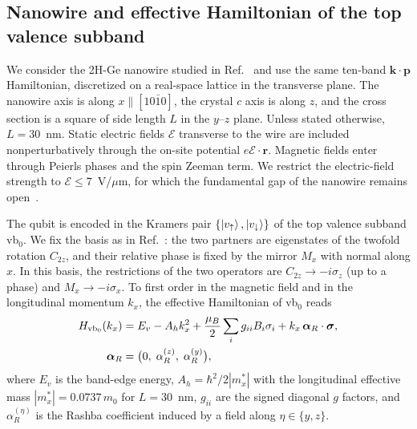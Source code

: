 \documentclass[
  aps,
  reprint,
  amsmath,
  amssymb,
  groupedaddress,
  floatfix,
  longbibliography,
]{revtex4-2}
\begin{document}
\subsection{Nanowire and effective Hamiltonian of the top valence subband}
\label{sec:pseudospin}

We consider the 2H-Ge nanowire studied in Ref.~\cite{das2026anisotropic} and use the same ten-band $\mathbf{k}\cdot\mathbf{p}$ Hamiltonian, discretized on a real-space lattice in the transverse plane. The nanowire axis is along $x\parallel[10\bar{1}0]$, the crystal $c$ axis is along $z$, and the cross section is a square of side length $L$ in the $y$--$z$ plane. Unless stated otherwise, $L=30$~nm. Static electric fields $\boldsymbol{\mathcal{E}}$ transverse to the wire are included nonperturbatively through the on-site potential $e\boldsymbol{\mathcal{E}}\cdot\mathbf{r}$. Magnetic fields enter through Peierls phases and the spin Zeeman term. We restrict the electric-field strength to $\mathcal{E}\le7$~V/$\mu$m, for which the fundamental gap of the nanowire remains open~\cite{das2026anisotropic}.

The qubit is encoded in the Kramers pair $\{\ket{v_\uparrow},\ket{v_\downarrow}\}$ of the top valence subband vb$_0$. We fix the basis as in Ref.~\cite{das2026anisotropic}: the two partners are eigenstates of the twofold rotation $C_{2z}$, and their relative phase is fixed by the mirror $M_x$ with normal along $x$. In this basis, the restrictions of the two operators are $C_{2z}\to-i\sigma_z$ (up to a phase) and $M_x\to-i\sigma_x$. To first order in the magnetic field and in the longitudinal momentum $k_x$, the effective Hamiltonian of vb$_0$ reads
\begin{align}
H_{\rm vb_0}(k_x)
&=
E_v-A_h k_x^2
+\frac{\mu_B}{2}\sum_{i}g_{ii}B_i\sigma_i
+k_x\,\bm{\alpha}_R\cdot\bm{\sigma},
\label{eq:Hpseudo}
\\
\bm{\alpha}_R
&=
\big(0,\;\alpha_R^{(z)},\;\alpha_R^{(y)}\big),
\label{eq:alphavec}
\end{align}
where $E_v$ is the band-edge energy, $A_h=\hbar^2/2|m_x^*|$ with the longitudinal effective mass $|m_x^*|=0.0737\,m_0$ for $L=30$~nm, $g_{ii}$ are the signed diagonal $g$ factors, and $\alpha_R^{(\eta)}$ is the Rashba coefficient induced by a field along $\eta\in\{y,z\}$.
\end{document}
